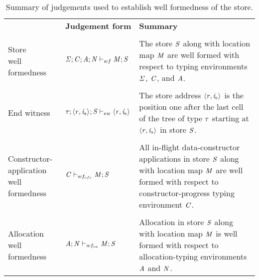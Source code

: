 \begin{table}
\bgroup
\begin{tabular}{llp{8cm}}
 & \textbf{Judgement form} & \textbf{Summary}
 \\\\
\parbox[t]{3.5cm}{Store \\ well formedness} & $\mathit{\Sigma};\mathit{C};\mathit{A};\mathit{N} \vdash_{wf} \mathit{M};\mathit{S}$ &

The store $\mathit{S}$ along with location map $\mathit{M}$ are well formed with respect to
typing environments $\mathit{\Sigma}$, $\mathit{C}$, and $\mathit{A}$.
\\\\
End witness & $\mathit{\tau};\langle \mathit{r}, \mathit{i}_{s} \rangle ^{};\mathit{S} \vdash_{ew} \langle \mathit{r}, \mathit{i}_{e} \rangle ^{}$ &

The store address $\langle \mathit{r}, \mathit{i}_{e} \rangle ^{}$ is the position one
after the last cell of the tree of type $\mathit{\tau}$ starting at
$\langle \mathit{r}, \mathit{i}_{s} \rangle ^{}$ in store $\mathit{S}$.
\\\\
\parbox[t]{3.5cm}{Constructor-application \\ well formedness}
 & $\mathit{C} \vdash_{wf_{cfc}} \mathit{M};\mathit{S}$ &

All in-flight data-constructor applications in store $\mathit{S}$ along with location map $\mathit{M}$
are well formed with respect to constructor-progress typing environment $\mathit{C}$.
\\\\
\parbox[t]{3.5cm}{Allocation \\ well formedness} & $\mathit{A};\mathit{N} \vdash_{wf_{ca}} \mathit{M};\mathit{S}$ &

Allocation in store $\mathit{S}$ along with location map $\mathit{M}$ is well formed
with respect to allocation-typing environments $\mathit{A}$ and $\mathit{N}$.
\end{tabular}
\egroup
\caption{Summary of judgements used to establish well formedness of the store.}
\label{tbl:swf-judgements}
\end{table}


